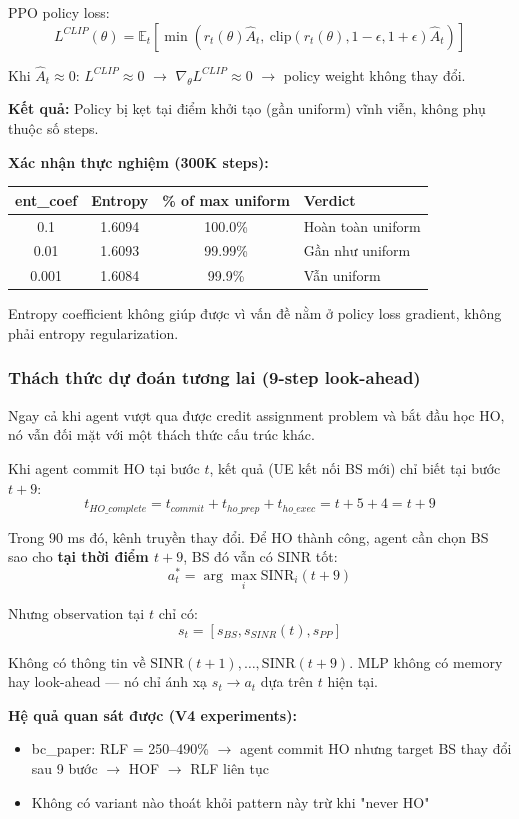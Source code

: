 \documentclass[11pt]{article}
\begin{document}
PPO policy loss:
\[
L^{CLIP}(\theta) = \mathbb{E}_t \left[ \min\left( r_t(\theta) \hat{A}_t,\ \text{clip}(r_t(\theta), 1-\epsilon, 1+\epsilon) \hat{A}_t \right) \right]
\]

Khi $\hat{A}_t \approx 0$: $L^{CLIP} \approx 0$ $\to$ $\nabla_\theta L^{CLIP} \approx 0$ $\to$ policy weight không thay đổi.

\textbf{Kết quả:} Policy bị kẹt tại điểm khởi tạo (gần uniform) vĩnh viễn, không phụ thuộc số steps.

\textbf{Xác nhận thực nghiệm (300K steps):}

\begin{longtable}{@{}cccl@{}}
\toprule
\textbf{ent\_coef} & \textbf{Entropy} & \textbf{\% of max uniform} & \textbf{Verdict} \\
\midrule
\endhead
0.1 & 1.6094 & 100.0\% & Hoàn toàn uniform \\
0.01 & 1.6093 & 99.99\% & Gần như uniform \\
0.001 & 1.6084 & 99.9\% & Vẫn uniform \\
\bottomrule
\end{longtable}

Entropy coefficient không giúp được vì vấn đề nằm ở policy loss gradient, không phải entropy regularization.

\subsubsection{Thách thức dự đoán tương lai (9-step look-ahead)}

Ngay cả khi agent vượt qua được credit assignment problem và bắt đầu học HO, nó vẫn đối mặt với một thách thức cấu trúc khác.

Khi agent commit HO tại bước $t$, kết quả (UE kết nối BS mới) chỉ biết tại bước $t+9$:
\[
t_{HO\_complete} = t_{commit} + t_{ho\_prep} + t_{ho\_exec} = t + 5 + 4 = t + 9
\]

Trong 90 ms đó, kênh truyền thay đổi. Để HO thành công, agent cần chọn BS sao cho \textbf{tại thời điểm $t+9$}, BS đó vẫn có SINR tốt:
\[
a_t^* = \arg\max_i \text{SINR}_i(t+9)
\]

Nhưng observation tại $t$ chỉ có:
\[
s_t = [s_{BS}, s_{SINR}(t), s_{PP}]
\]

Không có thông tin về $\text{SINR}(t+1), \ldots, \text{SINR}(t+9)$. MLP không có memory hay look-ahead --- nó chỉ ánh xạ $s_t \to a_t$ dựa trên $t$ hiện tại.

\textbf{Hệ quả quan sát được (V4 experiments):}
\begin{itemize}
  \item bc\_paper: RLF = 250--490\% $\to$ agent commit HO nhưng target BS thay đổi sau 9 bước $\to$ HOF $\to$ RLF liên tục
  \item Không có variant nào thoát khỏi pattern này trừ khi "never HO"
\end{itemize}
\end{document}
